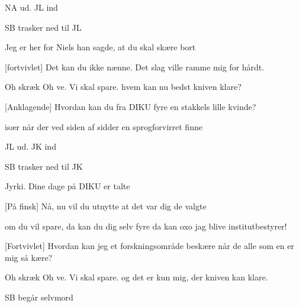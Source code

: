\documentclass[a4paper]{article}
\begin{document}
\begin{song}
  \scene NA ud. JL ind

  \scene SB trasker ned til JL

  Jeg er her for Niels han sagde,
  at du skal skære bort

  [fortvivlet]
  Det kan du ikke nænne.
  Det slag ville ramme mig for hårdt.

  Oh skræk Oh ve. Vi skal spare.
  hvem kan nu bedst kniven klare?

  [Anklagende]
  Hvordan kan du fra DIKU fyre
  en stakkels lille kvinde?

  især når der ved siden af sidder
  en sprogforvirret finne

  \scene JL ud. JK ind

  \scene SB trasker ned til JK

  Jyrki. Dine dage på DIKU er talte

  [På finsk]
  Nå, nu vil du utnytte at det var dig de valgte
  
  om du vil spare, da kan du dig selv fyre
  da kan oxo jag blive institutbestyrer!

  [Fortvivlet]
  Hvordan kan jeg et forskningsområde beskære
  når de alle som en er mig så kære?
  
  Oh skræk Oh ve. Vi skal spare.
  og det er kun mig, der kniven kan klare.

  \scene SB begår selvmord

\end{song}
\end{document}
